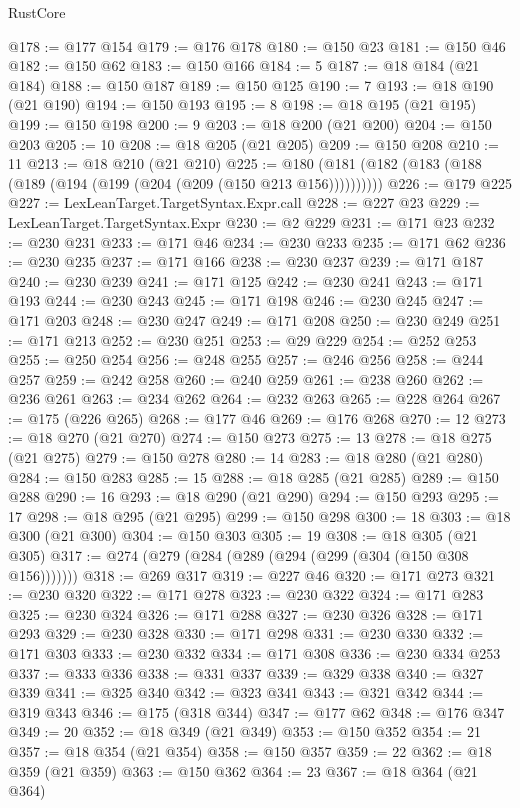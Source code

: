 \begin{lexlean}{RustCore}
\begin{coremodule}
@178 := @177 @154
@179 := @176 @178
@180 := @150 @23
@181 := @150 @46
@182 := @150 @62
@183 := @150 @166
@184 := 5
@187 := @18 @184 (@21 @184)
@188 := @150 @187
@189 := @150 @125
@190 := 7
@193 := @18 @190 (@21 @190)
@194 := @150 @193
@195 := 8
@198 := @18 @195 (@21 @195)
@199 := @150 @198
@200 := 9
@203 := @18 @200 (@21 @200)
@204 := @150 @203
@205 := 10
@208 := @18 @205 (@21 @205)
@209 := @150 @208
@210 := 11
@213 := @18 @210 (@21 @210)
@225 := @180 (@181 (@182 (@183 (@188 (@189 (@194 (@199 (@204 (@209 (@150 @213 @156))))))))))
@226 := @179 @225
@227 := LexLeanTarget.TargetSyntax.Expr.call
@228 := @227 @23
@229 := LexLeanTarget.TargetSyntax.Expr
@230 := @2 @229
@231 := @171 @23
@232 := @230 @231
@233 := @171 @46
@234 := @230 @233
@235 := @171 @62
@236 := @230 @235
@237 := @171 @166
@238 := @230 @237
@239 := @171 @187
@240 := @230 @239
@241 := @171 @125
@242 := @230 @241
@243 := @171 @193
@244 := @230 @243
@245 := @171 @198
@246 := @230 @245
@247 := @171 @203
@248 := @230 @247
@249 := @171 @208
@250 := @230 @249
@251 := @171 @213
@252 := @230 @251
@253 := @29 @229
@254 := @252 @253
@255 := @250 @254
@256 := @248 @255
@257 := @246 @256
@258 := @244 @257
@259 := @242 @258
@260 := @240 @259
@261 := @238 @260
@262 := @236 @261
@263 := @234 @262
@264 := @232 @263
@265 := @228 @264
@267 := @175 (@226 @265)
@268 := @177 @46
@269 := @176 @268
@270 := 12
@273 := @18 @270 (@21 @270)
@274 := @150 @273
@275 := 13
@278 := @18 @275 (@21 @275)
@279 := @150 @278
@280 := 14
@283 := @18 @280 (@21 @280)
@284 := @150 @283
@285 := 15
@288 := @18 @285 (@21 @285)
@289 := @150 @288
@290 := 16
@293 := @18 @290 (@21 @290)
@294 := @150 @293
@295 := 17
@298 := @18 @295 (@21 @295)
@299 := @150 @298
@300 := 18
@303 := @18 @300 (@21 @300)
@304 := @150 @303
@305 := 19
@308 := @18 @305 (@21 @305)
@317 := @274 (@279 (@284 (@289 (@294 (@299 (@304 (@150 @308 @156)))))))
@318 := @269 @317
@319 := @227 @46
@320 := @171 @273
@321 := @230 @320
@322 := @171 @278
@323 := @230 @322
@324 := @171 @283
@325 := @230 @324
@326 := @171 @288
@327 := @230 @326
@328 := @171 @293
@329 := @230 @328
@330 := @171 @298
@331 := @230 @330
@332 := @171 @303
@333 := @230 @332
@334 := @171 @308
@336 := @230 @334 @253
@337 := @333 @336
@338 := @331 @337
@339 := @329 @338
@340 := @327 @339
@341 := @325 @340
@342 := @323 @341
@343 := @321 @342
@344 := @319 @343
@346 := @175 (@318 @344)
@347 := @177 @62
@348 := @176 @347
@349 := 20
@352 := @18 @349 (@21 @349)
@353 := @150 @352
@354 := 21
@357 := @18 @354 (@21 @354)
@358 := @150 @357
@359 := 22
@362 := @18 @359 (@21 @359)
@363 := @150 @362
@364 := 23
@367 := @18 @364 (@21 @364)

\end{coremodule}
\end{lexlean}
